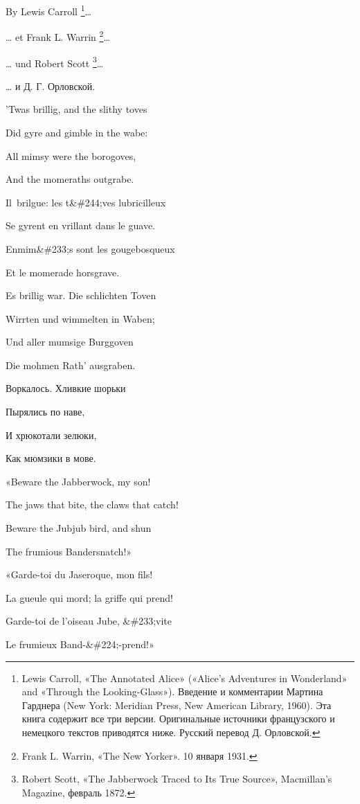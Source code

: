 \documentclass[../main.tex]{subfiles}
\begin{document}

By Lewis Carroll \footnote{Lewis Carroll, «The Annotated Alice» («Alice's Adventures in Wonderland» and «Through the Looking-Glass»). Введение и комментарии Мартина Гарднера (New York: Meridian Press, New American Library, 1960). Эта книга содержит все три версии. Оригинальные источники французского и немецкого текстов приводятся ниже. Русский перевод Д. Орловской.}\ldots{}

\ldots{} et Frank L. Warrin \footnote{Frank L. Warrin, «The New Yorker». 10 января 1931.}\ldots{}

\ldots{} und Robert Scott \footnote{Robert Scott, «The Jabberwock Traced to Its True Source», Macmillan's Magazine, февраль 1872.}\ldots{}

\ldots{} и Д. Г. Орловской.

'Twas brillig, and the slithy toves

Did gyre and gimble in the wabe:

All mimsy were the borogoves,

And the momeraths outgrabe.

Il~brilgue: les t\&\#244;ves lubricilleux

Se gyrent en vrillant dans le guave.

Enmim\&\#233;s sont les gougebosqueux

Et le momerade horsgrave.

Es brillig war. Die schlichten Toven

Wirrten und wimmelten in Waben;

Und aller mumsige Burggoven

Die mohmen Rath' ausgraben.

Воркалось. Хливкие шорьки

Пырялись по наве,

И хрюкотали зелюки,

Как мюмзики в мове.

«Beware the Jabberwock, my son!

The jaws that bite, the claws that catch!

Beware the Jubjub bird, and shun

The frumious Bandersnatch!»

«Garde-toi du Jaseroque, mon fils!

La gueule qui mord; la griffe qui prend!

Garde-toi de l'oiseau Jube, \&\#233;vite

Le frumieux Band-\&\#224;-prend!»
\end{document}

